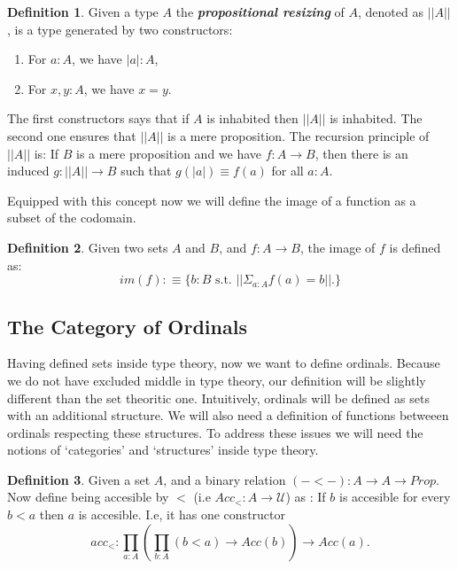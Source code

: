 \documentclass[11pt]{article}
\theoremstyle{definition}
\newtheorem{definition}{Definition}[section]
\theoremstyle{plain}
\theoremstyle{remark}
\newcommand{\U}{\mathscr{U}}
\begin{document}
\begin{definition}\label{D:Prop resize}
Given a type $A$ the \textbf{\textit{propositional resizing}} of $A$, denoted as $|| A ||$, is
a type generated by two constructors:
\begin{enumerate}
\item For $a : A$, we have $|a| : A$,
\item For $x,y : A$, we have $x = y$.
\end{enumerate}
The first constructors says that if $A$ is inhabited then $|| A ||$ is inhabited. The second
one ensures that $|| A ||$ is a mere proposition. The recursion principle of $|| A ||$ is:
If $B$ is a mere proposition and we have $f : A \to B$, then there is an induced 
$g : || A || \to B$ such that $g(|a|) \equiv f(a)$ for all $a : A$. 
\end{definition}
 
Equipped with this concept now we will define the image of a function as a subset of the 
codomain. 

\begin{definition}\label{D:Image}
Given two sets $A$ and $B$, and $f : A \to B$, the image of $f$ is defined as:
\[ im(f) :\equiv \{ b : B \text{ s.t. } || \Sigma_{a : A} f(a) = b|| .\}\]
\end{definition}

\subsection{The Category of Ordinals}\label{SS:Cat of ord}

Having defined sets inside type theory, now we want to define ordinals. Because we do not
have excluded middle in type theory, our definition will be slightly different than the
set theoritic one. Intuitively, ordinals will be defined as sets with an additional structure.
We will also need a definition of functions betweeen ordinals respecting these structures. 
To address these issues we will need the notions of `categories' and `structures' inside type 
theory.

\begin{definition}\label{D:Acc}
Given a set $A$, and a binary relation $(-<-) : A \to A \to Prop$. Now define being 
accesible by $<$ (i.e $Acc_{<} : A \to \U$) as : If $b$ is accesible for every $b<a$ 
then $a$ is accesible. I.e, it has one constructor 
\[ acc_< : \prod_{a : A} \left( \prod_{b : A} (b<a) \to Acc(b) \right) \to Acc(a). \]
\end{definition}
\end{document}
